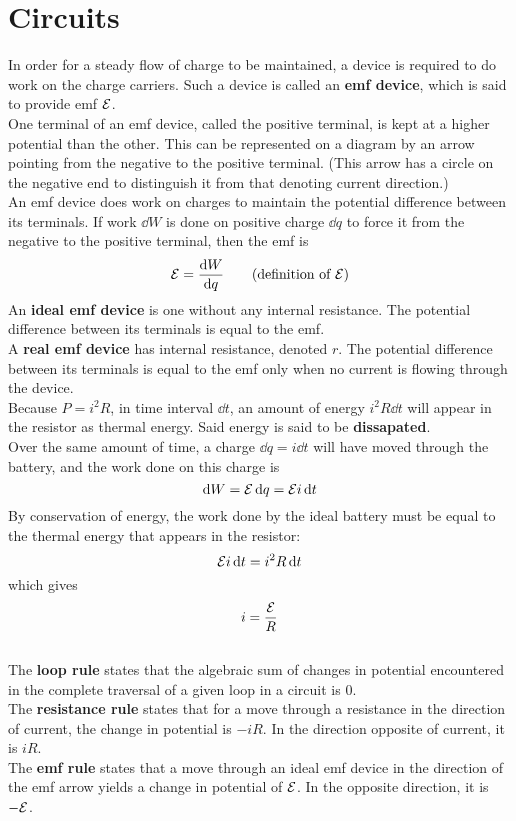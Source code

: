 \documentclass[./Electricity and Magnetism.tex]{subfiles}
\begin{document}
	\section{Circuits}
		In order for a steady flow of charge to be maintained, a device is required to do work on the charge carriers. Such a device is called an \textbf{emf device}, which is said to provide emf \(\mathcal{E}\). \\
		One terminal of an emf device, called the positive terminal, is kept at a higher potential than the other. This can be represented on a diagram by an arrow pointing from the negative to the positive terminal. (This arrow has a circle on the negative end to distinguish it from that denoting current direction.) \\
		An emf device does work on charges to maintain the potential difference between its terminals. If work \(\dd{W}\) is done on positive charge \(\dd{q}\) to force it from the negative to the positive terminal, then the emf is
			\[\emf = \dv{W}{q} \tag{definition of \(\emf\)}\]
		An \textbf{ideal emf device} is one without any internal resistance. The potential difference between its terminals is equal to the emf. \\
		A \textbf{real emf device} has internal resistance, denoted \(r\). The potential difference between its terminals is equal to the emf only when no current is flowing through the device. \\
		Because \(P = i^2R\), in time interval \(\dd{t}\), an amount of energy \(i^2R\dd{t}\) will appear in the resistor as thermal energy. Said energy is said to be \textbf{dissapated}. \\
			Over the same amount of time, a charge \(\dd{q} = i\dd{t}\) will have moved through the battery, and the work done on this charge is
			\[
				\dd{W} = \mathcal{E}\dd{q}
					= \mathcal{E} i\dd{t}
			\]
			By conservation of energy, the work done by the ideal battery must be equal to the thermal energy that appears in the resistor:
				\[\mathcal{E} i\dd{t} = i^2R\dd{t}\]
				which gives
				\[i = \frac{\mathcal{E}}{R}\] \\
		The \textbf{loop rule} states that the algebraic sum of changes in potential encountered in the complete traversal of a given loop in a circuit is 0. \\
		The \textbf{resistance rule} states that for a move through a resistance in the direction of current, the change in potential is \(-iR\). In the direction opposite of current, it is \(iR\). \\
		The \textbf{emf rule} states that a move through an ideal emf device in the direction of the emf arrow yields a change in potential of \(\mathcal{E}\). In the opposite direction, it is \(-\mathcal{E}\). \\
\end{document}
